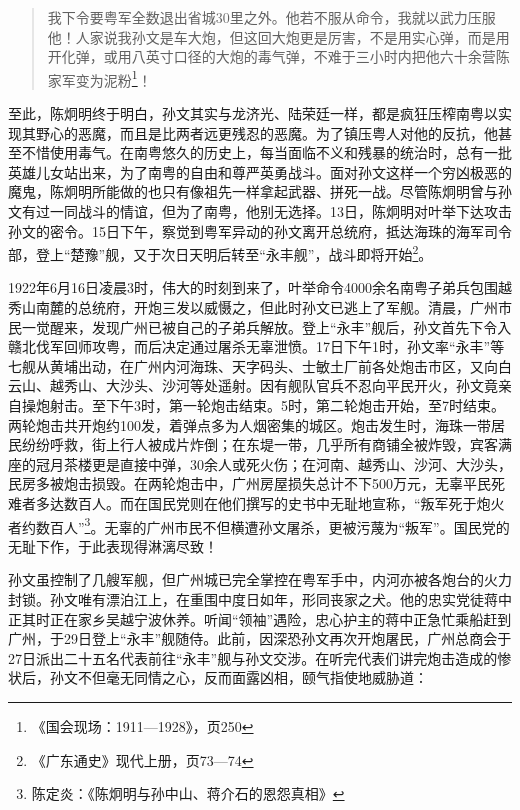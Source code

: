 \begin{quote}

我下令要粤军全数退出省城30里之外。他若不服从命令，我就以武力压服他！人家说我孙文是车大炮，但这回大炮更是厉害，不是用实心弹，而是用开化弹，或用八英寸口径的大炮的毒气弹，不难于三小时内把他六十余营陈家军变为泥粉\footnote{《国会现场：1911—1928》，页250}！

\end{quote}

至此，陈炯明终于明白，孙文其实与龙济光、陆荣廷一样，都是疯狂压榨南粤以实现其野心的恶魔，而且是比两者远更残忍的恶魔。为了镇压粤人对他的反抗，他甚至不惜使用毒气。在南粤悠久的历史上，每当面临不义和残暴的统治时，总有一批英雄儿女站出来，为了南粤的自由和尊严英勇战斗。面对孙文这样一个穷凶极恶的魔鬼，陈炯明所能做的也只有像祖先一样拿起武器、拼死一战。尽管陈炯明曾与孙文有过一同战斗的情谊，但为了南粤，他别无选择。13日，陈炯明对叶举下达攻击孙文的密令。15日下午，察觉到粤军异动的孙文离开总统府，抵达海珠的海军司令部，登上“楚豫”舰，又于次日天明后转至“永丰舰”，战斗即将开始\footnote{《广东通史》现代上册，页73—74}。

1922年6月16日凌晨3时，伟大的时刻到来了，叶举命令4000余名南粤子弟兵包围越秀山南麓的总统府，开炮三发以威慑之，但此时孙文已逃上了军舰。清晨，广州市民一觉醒来，发现广州已被自己的子弟兵解放。登上“永丰”舰后，孙文首先下令入赣北伐军回师攻粤，而后决定通过屠杀无辜泄愤。17日下午1时，孙文率“永丰”等七舰从黄埔出动，在广州内河海珠、天字码头、士敏土厂前各处炮击市区，又向白云山、越秀山、大沙头、沙河等处遥射。因有舰队官兵不忍向平民开火，孙文竟亲自操炮射击。至下午3时，第一轮炮击结束。5时，第二轮炮击开始，至7时结束。两轮炮击共开炮约100发，着弹点多为人烟密集的城区。炮击发生时，海珠一带居民纷纷呼救，街上行人被成片炸倒；在东堤一带，几乎所有商铺全被炸毁，宾客满座的冠月茶楼更是直接中弹，30余人或死火伤；在河南、越秀山、沙河、大沙头，民房多被炮击损毁。在两轮炮击中，广州房屋损失总计不下500万元，无辜平民死难者多达数百人。而在国民党则在他们撰写的史书中无耻地宣称，“叛军死于炮火者约数百人”\footnote{陈定炎：《陈炯明与孙中山、蒋介石的恩怨真相》}。无辜的广州市民不但横遭孙文屠杀，更被污蔑为“叛军”。国民党的无耻下作，于此表现得淋漓尽致！

孙文虽控制了几艘军舰，但广州城已完全掌控在粤军手中，内河亦被各炮台的火力封锁。孙文唯有漂泊江上，在重围中度日如年，形同丧家之犬。他的忠实党徒蒋中正其时正在家乡吴越宁波休养。听闻“领袖”遇险，忠心护主的蒋中正急忙乘船赶到广州，于29日登上“永丰”舰随侍。此前，因深恐孙文再次开炮屠民，广州总商会于27日派出二十五名代表前往“永丰”舰与孙文交涉。在听完代表们讲完炮击造成的惨状后，孙文不但毫无同情之心，反而面露凶相，颐气指使地威胁道：

